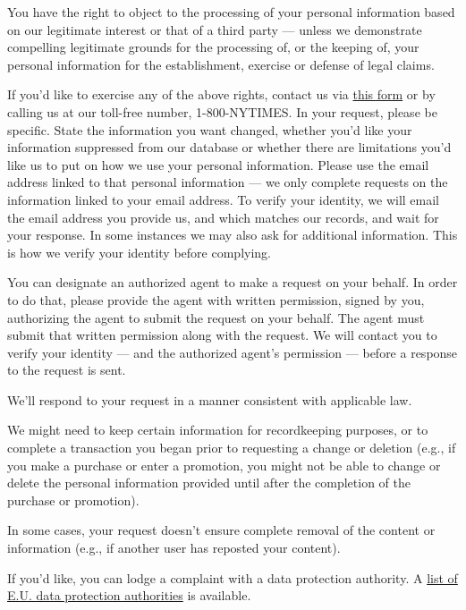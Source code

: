 You have the right to object to the processing of your personal
information based on our legitimate interest or that of a third party
--- unless we demonstrate compelling legitimate grounds for the
processing of, or the keeping of, your personal information for the
establishment, exercise or defense of legal claims.

If you'd like to exercise any of the above rights, contact us via
\href{https://www.nytimes3xbfgragh.onion/data-subject-request}{this
form} or by calling us at our toll-free number, 1-800-NYTIMES. In your
request, please be specific. State the information you want changed,
whether you'd like your information suppressed from our database or
whether there are limitations you'd like us to put on how we use your
personal information. Please use the email address linked to that
personal information --- we only complete requests on the information
linked to your email address. To verify your identity, we will email the
email address you provide us, and which matches our records, and wait
for your response. In some instances we may also ask for additional
information. This is how we verify your identity before complying.

You can designate an authorized agent to make a request on your behalf.
In order to do that, please provide the agent with written permission,
signed by you, authorizing the agent to submit the request on your
behalf. The agent must submit that written permission along with the
request. We will contact you to verify your identity --- and the
authorized agent's permission --- before a response to the request is
sent.

We'll respond to your request in a manner consistent with applicable
law.

We might need to keep certain information for recordkeeping purposes, or
to complete a transaction you began prior to requesting a change or
deletion (e.g., if you make a purchase or enter a promotion, you might
not be able to change or delete the personal information provided until
after the completion of the purchase or promotion).

In some cases, your request doesn't ensure complete removal of the
content or information (e.g., if another user has reposted your
content).

If you'd like, you can lodge a complaint with a data protection
authority. A
\href{https://ec.europa.eu/newsroom/article29/item-detail.cfm?item_id=612080}{list
of E.U. data protection authorities} is available.

